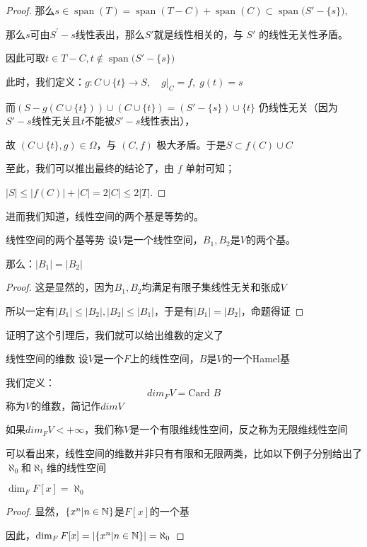 \documentclass[12pt, a4paper, oneside, UTF8]{ctexbook}
\begin{document}
\begin{proof}
				那么$s\in\operatorname{span}(T)=\operatorname{span}(T- C)+\operatorname{span}(C)\subset \operatorname{span}\bigl(S'-\{s\}\bigr)$,
				
				那么$s$可由$S^\prime{}-{s}$线性表出，那么$S'$就是线性相关的，与 $S'$ 的线性无关性矛盾。
				
				因此可取$t\in T- C,t\notin\operatorname{span}\bigl(S'-\{s\}\bigr)$
				
				此时，我们定义：$g:C\cup\{t\}\longrightarrow S,\quad g|_C=f,\;g(t)=s$

				而$(S- g(C\cup\{t\}))\cup (C\cup\{t\})=(S'-\{s\})\cup\{t\}$ 仍线性无关（因为$S'-{s}$线性无关且$t$不能被$S'-{s}$线性表出），
				
				故 $(C\cup\{t\},g)\in\Omega$，与 $(C,f)$ 极大矛盾。于是$S\subset f(C)\cup C$

				至此，我们可以推出最终的结论了，由 $f$ 单射可知；
				
				$|S|\leqslant |f(C)|+|C|= 2|C|\leqslant 2|T|.$
			\end{proof}
			进而我们知道，线性空间的两个基是等势的。
			\begin{lemma}{线性空间的两个基等势}{}
				设$V$是一个线性空间，$B_1,B_2$是$V$的两个基。

				那么：$|B_1|=|B_2|$
			\end{lemma}
			\begin{proof}
				这是显然的，因为$B_1,B_2$均满足有限子集线性无关和张成$V$

				所以一定有$|B_1| \leqslant |B_2|,|B_2| \leqslant |B_1|$，于是有$|B_1|=|B_2|$，命题得证
			\end{proof}
			证明了这个引理后，我们就可以给出维数的定义了
			\begin{defn}{线性空间的维数}{}
				设$V$是一个$F$上的线性空间，$B$是$V$的一个Hamel基

				我们定义：
				\begin{equation}
					dim_F V = \text{Card }B
				\end{equation}
				称为$V$的维数，简记作$dim V$

				如果$dim_F V < +\infty$，我们称$V$是一个有限维线性空间，反之称为无限维线性空间
			\end{defn}
			可以看出来，线性空间的维数并非只有有限和无限两类，比如以下例子分别给出了$\aleph_0$和$\aleph_1$维的线性空间
			\begin{example}
				$\dim_F F[x] = \aleph_0$
			\end{example}
			\begin{proof}
				显然，$\{x^n | n \in \mathbb{N}\}$是$F[x]$的一个基

				因此，$\dim_F F[x] = |\{x^n | n \in \mathbb{N}\}| = \aleph_0$
			\end{proof}
\end{document}
